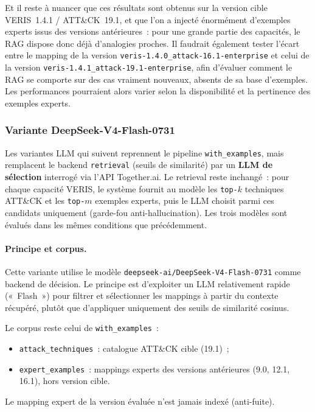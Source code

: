 \documentclass[a4paper,12pt]{article}
\begin{document}
Et il reste à nuancer que ces résultats sont obtenus sur la version cible
VERIS~1.4.1 / ATT\&CK~19.1, et que l'on a injecté énormément d'exemples experts
issus des versions antérieures~: pour une grande partie des capacités, le RAG
dispose donc déjà d'analogies proches. Il faudrait également tester l'écart
entre le mapping de la version \texttt{veris-1.4.0\_attack-16.1-enterprise} et
celui de la version \texttt{veris-1.4.1\_attack-19.1-enterprise}, afin
d'évaluer comment le RAG se comporte sur des cas vraiment nouveaux, absents de
sa base d'exemples. Les performances pourraient alors varier selon la
disponibilité et la pertinence des exemples experts.

\subsubsection{Variante DeepSeek-V4-Flash-0731}

Les variantes LLM qui suivent reprennent le pipeline
\texttt{with\_examples}, mais remplacent le backend
\texttt{retrieval} (seuils de similarité) par un \textbf{LLM de
sélection} interrogé via l'API Together.ai. Le retrieval reste
inchangé~: pour chaque capacité VERIS, le système fournit au modèle
les \texttt{top-$k$} techniques ATT\&CK et les \texttt{top-$m$}
exemples experts, puis le LLM choisit parmi ces candidats uniquement
(garde-fou anti-hallucination). Les trois modèles sont évalués dans
les mêmes conditions que précédemment.

\paragraph{Principe et corpus.}
Cette variante utilise le modèle
\texttt{deepseek-ai/DeepSeek-V4-Flash-0731} comme backend de
décision. Le principe est d'exploiter un LLM relativement rapide
(«~Flash~») pour filtrer et sélectionner les mappings à partir du
contexte récupéré, plutôt que d'appliquer uniquement des seuils de
similarité cosinus.

Le corpus reste celui de \texttt{with\_examples}~:
\begin{itemize}
    \item \texttt{attack\_techniques}~: catalogue ATT\&CK cible (19.1)~;
    \item \texttt{expert\_examples}~: mappings experts des versions
          antérieures (9.0, 12.1, 16.1), hors version cible.
\end{itemize}
Le mapping expert de la version évaluée n'est jamais indexé
(anti-fuite). 
\end{document}
